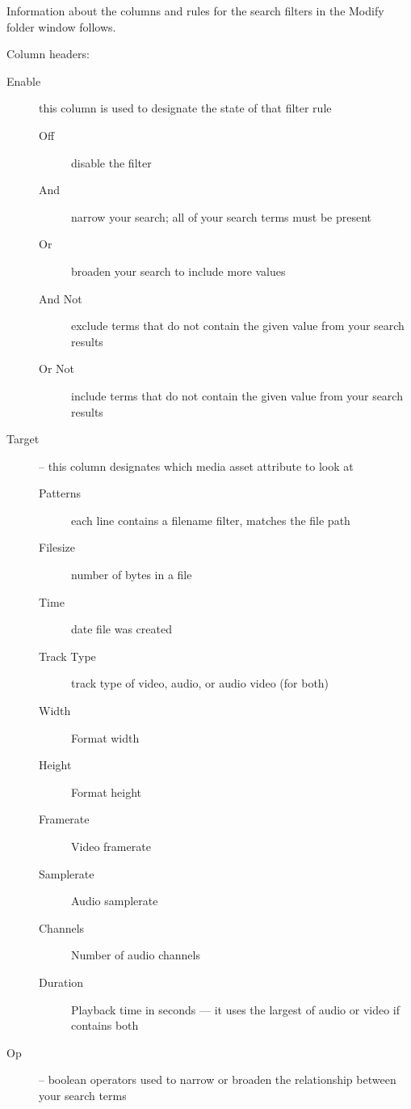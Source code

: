 Information about the columns and rules for the search filters in the Modify folder window follows.

Column headers:

\begin{description}
\item[ Enable]  this column is used to designate the state of that filter rule
    \begin{description}
        \item[ Off]		disable the filter
                \item[And] 		narrow your search; all of your search terms must be present
                \item[Or]		broaden your search to include more values
                \item[And Not]	exclude terms that do not contain the given value from your search results
                \item[Or Not]	include terms that do not contain the given value from your search results
    \end{description}
\item [Target] – this column designates which media asset attribute to look at
    \begin{description}
        \item[ Patterns]	each line contains a filename filter, matches the file path
                \item[Filesize]	number of bytes in a file
                \item[Time]		date file was created
                \item[Track Type]	track type of video, audio, or audio video (for both)
                \item[Width]	Format width
                \item[Height]	Format height
                \item[Framerate]	Video framerate
                \item[Samplerate]	Audio samplerate
                \item[Channels]	Number of audio channels
                \item[Duration]	Playback time in seconds --- it uses the largest of audio or video if contains both
    \end{description}
\item[Op] – boolean operators used to narrow or broaden the relationship between your search terms
    \begin{description}

\end{description}
\end{description}
